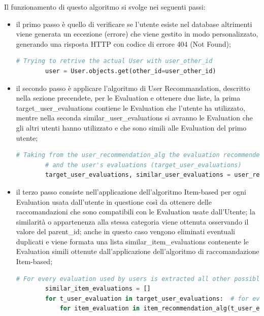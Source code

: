Il funzionamento di questo algoritmo si svolge nei seguenti passi:
\begin{itemize}
	\item il primo passo è quello di verificare se l'utente esiste nel database altrimenti viene generata un eccezione (errore) che viene gestito in
	modo personalizzato, generando una risposta HTTP con codice di errore 404 (Not Found);
	\begin{lstlisting}[language=Python, label=lst:CF_Hybrid_Evaluation_2]
		# Trying to retrive the actual User with user_other_id
		user = User.objects.get(other_id=user_other_id)
	\end{lstlisting} 
	\item il secondo passo è applicare l'algoritmo di User Recommandation, descritto nella sezione precendete, per le Evaluation e ottenere due liste,
	la prima target\_user\_evaluations contiene le Evaluation che l'utente ha utilizzato, mentre nella seconda similar\_user\_evaluations si avranno
	le Evaluation che gli altri utenti hanno utilizzato e che sono simili alle Evaluation del primo utente;
	\begin{lstlisting}[language=Python, label=lst:CF_Hybrid_Evaluation_3]
		# Taking from the user_recommendation_alg the evaluation recommended from this approach (similar_user_evaluations)
		# and the user's evaluations (target_user_evaluations)
		target_user_evaluations, similar_user_evaluations = user_recommendation_alg(user_other_id)
	\end{lstlisting} 
	\item il terzo passo consiste nell'applicazione dell'algoritmo Item-based per ogni Evaluation usata dall'utente in questione così da ottenere 
	delle raccomandazioni che sono compatibili con le Evaluation usate dall'Utente; la similarità o appartenenza alla stessa categoria viene 
	ottenuta osservando il valore del parent\_id; anche in questo caso vengono eliminati eventuali duplicati e viene formata una lista 
	similar\_item\_evaluations contenente le Evaluation simili ottenute dall'applicazione dell'algoritmo di raccomandazione Item-based;
	\begin{lstlisting}[language=Python, label=lst:CF_Hybrid_Evaluation_4]
		# For every evaluation used by users is extracted all other possible evaluations that have the same 'parent_id'
		similar_item_evaluations = []
		for t_user_evaluation in target_user_evaluations:  # for every target user's evaluations
			for item_evaluation in item_recommendation_alg(t_user_evaluation['other_id']):  # is applied the item_recommendation algorithm

\end{lstlisting}
\end{itemize}
